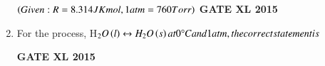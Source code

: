 \documentclass[journal,12pt,onecolumn]{IEEEtran}
\begin{document}
\begin{enumerate}
$\left(Given: R=8.314 JK mol, 1 atm = 760 Torr\right)$
\hfill{\textbf{GATE XL 2015}}
\item For the process, H$_2O\left(l\right)\leftrightarrow H_2O\left(s\right) at 0\degree C and 1 atm, the correct statement is$
    \begin{enumerate}
    \end{enumerate}
\hfill{\textbf{GATE XL 2015}}
	


\end{enumerate}
\end{document}
